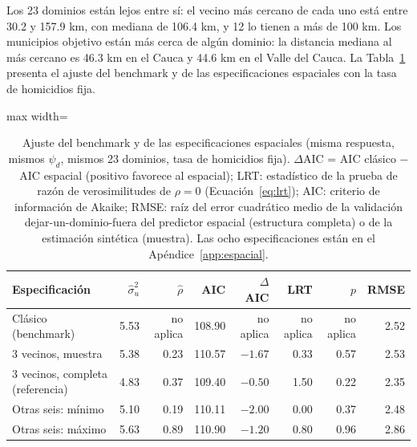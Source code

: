 Los 23 dominios están lejos entre sí: el vecino más cercano de cada uno está entre 30.2 y 157.9 km, con mediana de 106.4 km, y 12 lo tienen a más de 100 km. Los municipios objetivo están más cerca de algún dominio: la distancia mediana al más cercano es 46.3 km en el Cauca y 44.6 km en el Valle del Cauca. La Tabla~\ref{tab:res_espacial} presenta el ajuste del benchmark y de las especificaciones espaciales con la tasa de homicidios fija.

\begin{table}[!htbp]
\centering
\small
\caption{Ajuste del benchmark y de las especificaciones espaciales (misma respuesta, mismos $\psi_d$, mismos 23 dominios, tasa de homicidios fija). $\Delta$AIC = AIC clásico $-$ AIC espacial (positivo favorece al espacial); LRT: estadístico de la prueba de razón de verosimilitudes de $\rho = 0$ (Ecuación~\ref{eq:lrt}); AIC: criterio de información de Akaike; RMSE: raíz del error cuadrático medio de la validación dejar-un-dominio-fuera del predictor espacial (estructura completa) o de la estimación sintética (muestra). Las ocho especificaciones están en el Apéndice~\ref{app:espacial}.}
\label{tab:res_espacial}
\begin{adjustbox}{max width=\linewidth}
\begin{tabular}{l r r r r r r r}
\toprule
Especificación & $\hat{\sigma}_u^2$ & $\hat{\rho}$ & AIC & $\Delta$AIC & LRT & $p$ & RMSE \\
\midrule
Clásico (benchmark) & 5.53 & no aplica & 108.90 & no aplica & no aplica & no aplica & 2.52 \\
3 vecinos, muestra & 5.38 & 0.23 & 110.57 & $-1.67$ & 0.33 & 0.57 & 2.53 \\
3 vecinos, completa (referencia) & 4.83 & 0.37 & 109.40 & $-0.50$ & 1.50 & 0.22 & 2.35 \\
Otras seis: mínimo & 5.10 & 0.19 & 110.11 & $-2.00$ & 0.00 & 0.37 & 2.48 \\
Otras seis: máximo & 5.63 & 0.89 & 110.90 & $-1.20$ & 0.80 & 0.96 & 2.86 \\
\bottomrule
\end{tabular}
\end{adjustbox}
\end{table}

